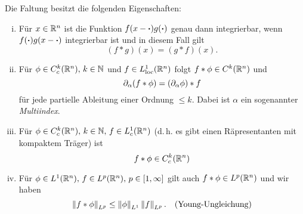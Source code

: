\documentclass[skript.tex]{subfiles}
\begin{document}
	\begin{lem}
		Die Faltung besitzt die folgenden Eigenschaften:
		\begin{enumerate}[(i)]
			\item Für $x \in \mathbb{R}^n$ ist die Funktion $f(x-\boldsymbol{\cdot})g(\boldsymbol{\cdot})$ genau dann integrierbar, wenn $f(\boldsymbol{\cdot})g(x-\boldsymbol{\cdot})$ integrierbar ist und in diesem Fall gilt
			\[
				(f \ast g)(x) = (g \ast f)(x).
			\]
			
			\item Für $\phi \in C_c^k(\mathbb{R}^n),\, k\in\mathbb{N}$ und $f \in L_\text{loc}^1(\mathbb{R}^n)$ folgt $f \ast \phi \in C^k(\mathbb{R}^n)$ und
			\[
				\partial_\alpha(f\ast\phi) = (\partial_\alpha\phi)\ast f
			\]
			für jede partielle Ableitung einer Ordnung $\leq k$. Dabei ist $\alpha$ ein sogenannter \emph{Multiindex}.
			
			\item Für $\phi \in C_c^k(\mathbb{R}^n),\, k\in\mathbb{N},\, f \in L_c^1(\mathbb{R}^n)$ (d.\,h. es gibt einen Räpresentanten mit kompaktem Träger) ist
			\[
				f\ast\phi \in C_c^k(\mathbb{R}^n)
			\]
			
			\item Für $\phi \in L^1(\mathbb{R}^n),\, f \in L^p(\mathbb{R}^n),\, p \in [1,\infty]$ gilt auch $f \ast \phi \in L^p(\mathbb{R}^n)$ und wir haben
			\[
				\left\lVert f\ast\phi \right\rVert_{L^p} \leq \left\lVert \phi \right\rVert_{L^1} \left\lVert f \right\rVert_{L^p}.\quad\text{(Young-Ungleichung)}
			\]
		\end{enumerate}
	\end{lem}
\end{document}
